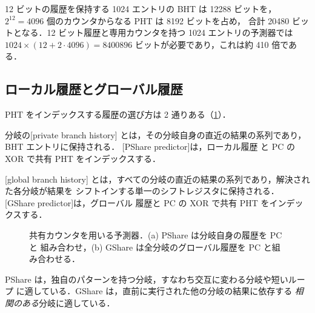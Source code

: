 \documentclass[../main.tex]{subfiles}
\begin{document}
\begin{example}
  12 ビットの履歴を保持する 1024 エントリの BHT は \num{12288} ビットを，
  $2^{12} = 4096$ 個のカウンタからなる PHT は \num{8192} ビットを占め，
  合計 \num{20480} ビットとなる．12 ビット履歴と専用カウンタを持つ
  1024 エントリの予測器では $1024 \times (12 + 2\cdot 4096) = \num{8400896}$
  ビットが必要であり，これは約 410 倍である．
\end{example}

\subsection{ローカル履歴とグローバル履歴}

PHT をインデックスする履歴の選び方は 2 通りある（\cref{fig:l04-pshare-gshare}）．

\begin{definition}[PShare]
  分岐の[private branch history]%
  とは，その分岐自身の直近の結果の系列であり，BHT エントリに保持される．
  [PShare predictor]は，ローカル履歴
  と PC の XOR で共有 PHT をインデックスする．
\end{definition}

\begin{definition}[GShare]
  [global branch history]%
  とは，すべての分岐の直近の結果の系列であり，解決された各分岐が結果を
  シフトインする単一のシフトレジスタに保持される．
  [GShare predictor]は，グローバル
  履歴と PC の XOR で共有 PHT をインデックスする．
\end{definition}

\begin{figure}[htbp]
  \centering
  
  \caption{共有カウンタを用いる予測器．(a) PShare は分岐自身の履歴を PC と
    組み合わせ，(b) GShare は全分岐のグローバル履歴を PC と組み合わせる．}
  \label{fig:l04-pshare-gshare}
\end{figure}

PShare は，独自のパターンを持つ分岐，すなわち交互に変わる分岐や短いループ
に適している．GShare は，直前に実行された他の分岐の結果に依存する
\emph{相関のある}分岐に適している．
\end{document}
